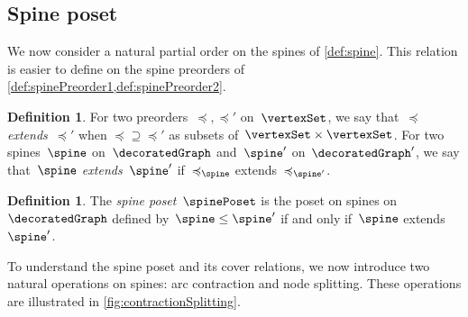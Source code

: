 \documentclass{amsart}
\theoremstyle{definition}
\newtheorem{definition}[theorem]{Definition}
\newcommand{\darkblue}{\color{darkblue}} %
\newcommand{\defn}[1]{\textsl{\darkblue #1}} %
\begin{document}
\subsection{Spine poset}
\label{subsec:spinePoset}

We now consider a natural partial order on the spines of \cref{def:spine}.
This relation is easier to define on the spine preorders of \cref{def:spinePreorder1,def:spinePreorder2}.

\begin{definition}
  \label{def:extensionPreorders}
  For two preorders~$\preccurlyeq, \preccurlyeq'$ on~$\vertexSet$, we say that~$\preccurlyeq$ \defn{extends}~$\preccurlyeq'$ when ${\preccurlyeq} \supseteq {\preccurlyeq'}$ as subsets of~$\vertexSet \times \vertexSet$.
  For two spines~$\spine$ on~$\decoratedGraph$ and~$\spine'$ on~$\decoratedGraph'$, we say that~$\spine$ \defn{extends}~$\spine'$ if~$\preccurlyeq_{\spine}$ extends~$\preccurlyeq_{\spine'}$.
\end{definition}

\begin{definition}
  \label{def:spinePoset}
  The \defn{spine poset}~$\spinePoset$ is the poset on spines on~$\decoratedGraph$ defined by~$\spine \le \spine'$ if and only if~$\spine$ extends~$\spine'$.
\end{definition}

To understand the spine poset and its cover relations, we now introduce two natural operations on spines: arc contraction and node splitting.
These operations are illustrated in \cref{fig:contractionSplitting}.
\end{document}
